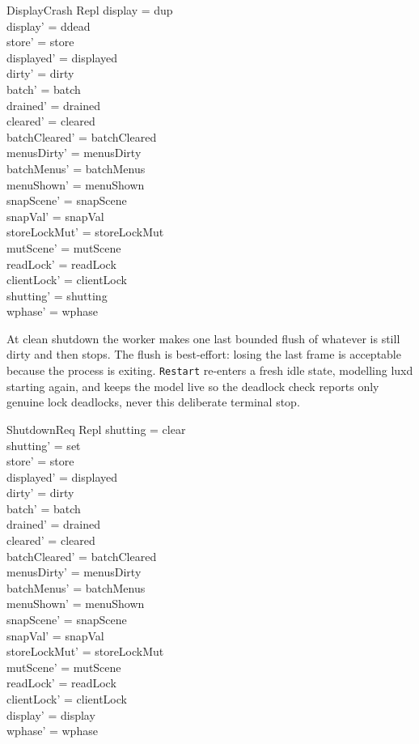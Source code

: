 \documentclass[a4paper,10pt,fleqn]{article}
\begin{document}
\begin{schema}{DisplayCrash}
  \Delta Repl
\where
  display = dup \\
  display' = ddead \\
  store' = store \\
  displayed' = displayed \\
  dirty' = dirty \\
  batch' = batch \\
  drained' = drained \\
  cleared' = cleared \\
  batchCleared' = batchCleared \\
  menusDirty' = menusDirty \\
  batchMenus' = batchMenus \\
  menuShown' = menuShown \\
  snapScene' = snapScene \\
  snapVal' = snapVal \\
  storeLockMut' = storeLockMut \\
  mutScene' = mutScene \\
  readLock' = readLock \\
  clientLock' = clientLock \\
  shutting' = shutting \\
  wphase' = wphase
\end{schema}

At clean shutdown the worker makes one last bounded flush of whatever is
still dirty and then stops.  The flush is best-effort: losing the last
frame is acceptable because the process is exiting.  \texttt{Restart}
re-enters a fresh idle state, modelling luxd starting again, and keeps the
model live so the deadlock check reports only genuine lock deadlocks, never
this deliberate terminal stop.

\begin{schema}{ShutdownReq}
  \Delta Repl
\where
  shutting = clear \\
  shutting' = set \\
  store' = store \\
  displayed' = displayed \\
  dirty' = dirty \\
  batch' = batch \\
  drained' = drained \\
  cleared' = cleared \\
  batchCleared' = batchCleared \\
  menusDirty' = menusDirty \\
  batchMenus' = batchMenus \\
  menuShown' = menuShown \\
  snapScene' = snapScene \\
  snapVal' = snapVal \\
  storeLockMut' = storeLockMut \\
  mutScene' = mutScene \\
  readLock' = readLock \\
  clientLock' = clientLock \\
  display' = display \\
  wphase' = wphase
\end{schema}
\end{document}
